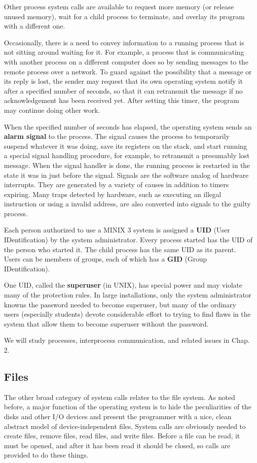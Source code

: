 \documentclass{book}
\newcommand {\kw}  [1] {\textbf{#1}}
\begin{document}
Other process system calls are available to request more memory (or release unused memory),
wait for a child process to terminate, and overlay its program with a different one.

Occasionally, there is a need to convey information to a running process that is not sitting around waiting for it.
For example, a process that is communicating with another process on a different computer does so 
by sending messages to the remote process over a network.
To guard against the possibility that a message or its reply is lost, the sender may request that its own operating system notify it 
after a specified number of seconds, so that it can retransmit the message if no acknowledgement has been received yet.
After setting this timer, the program may continue doing other work.

When the specified number of seconds has elapsed, the operating system sends an \kw{alarm signal} to the process.
The signal causes the process to temporarily suspend whatever it was doing, save its registers on the stack, 
and start running a special signal handling procedure, for example, to retransmit a presumably lost message.
When the signal handler is done, the running process is restarted in the state it was in just before the signal.
Signals are the software analog of hardware interrupts.
They are generated by a variety of causes in addition to timers expiring.
Many traps detected by hardware, such as executing an illegal instruction or using a invalid address, 
are also converted into signals to the guilty process.

Each person authorized to use a MINIX 3 system is assigned a \kw{UID} (User IDentification) by the system administrator.
Every process started has the UID of the person who started it.
The child process has the same UID as its parent.
Users can be members of groups, each of which has a \kw{GID} (Group IDentification).

One UID, called the \kw{superuser} (in UNIX), has special power and may violate many of the protection rules.
In large installations, only the system administrator knowns the password needed to become superuser, 
but many of the ordinary users (especially students) devote considerable effort to trying to find flaws in the system 
that allow them to become superuser without the password.

We will study processes, interprocess communication, and related issues in Chap. 2.

\subsection{Files}
The other broad category of system calls relates to the file system.
As noted before, a major function of the operating system is to hide the peculiarities of the disks and other I/O devices 
and present the programmer with a nice, clean abstract model of device-independent files.
System calls are obviously needed to create files, remove files, read files, and write files.
Before a file can be read, it must be opened, and after it has been read it should be closed, so calls are provided to do these things.
\end{document}
